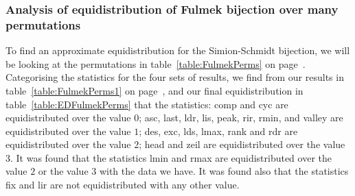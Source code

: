 \documentclass[12pt]{article}
\begin{document}
\subsubsection{Analysis of equidistribution of Fulmek bijection over many permutations}
To find an approximate equidistribution for the Simion-Schmidt bijection, we will be looking at the permutations in table~\ref{table:FulmekPerms} on page~\pageref{table:FulmekPerms}. Categorising the statistics for the four sets of results, we find from our results in table~\ref{table:FulmekPerms1} on page~\pageref{table:FulmekPerms1}, and our final equidistribution in table~\ref{table:EDFulmekPerms} that the statistics: comp and cyc are equidistributed over the value $0$; asc, last, ldr, lis, peak, rir, rmin, and valley are equidistributed over the value $1$; des, exc, lds, lmax, rank and rdr are equidistributed over the value $2$; head and zeil are equidistributed over the value $3$. It was found that the statistics lmin and rmax are equidistributed over the value $2$ or the value $3$ with the data we have. It was found also that the statistics fix and lir are not equidistributed with any other value. 

\newpage



\newpage
\end{document}
